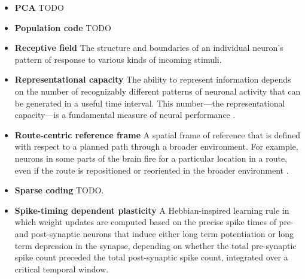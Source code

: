 \begin{itemize}
\item \textbf{\Acf{PCA}} TODO

\item \textbf{Population code} TODO

\item \textbf{Receptive field}  The structure and boundaries of an individual neuron's pattern of response to various kinds of incoming stimuli.

\item \textbf{Representational capacity} The ability to represent information depends on the number of recognizably different patterns of neuronal activity that can be generated in a useful time interval. This number---the representational capacity---is a fundamental measure of neural performance \cite{Laughlin2001}.

\item \textbf{Route-centric reference frame} A spatial frame of reference that is defined with respect to a planned path through a broader environment. For example, neurons in some parts of the brain fire for a particular location in a route, even if the route is repositioned or reoriented in the broader environment \cite{nitz2009parietal}.

\item \textbf{Sparse coding} TODO.

\item \textbf{Spike-timing dependent plasticity}  A Hebbian-inspired learning rule in which weight updates are computed based on the precise spike times of pre- and post-synaptic neurons that induce either long term potentiation or long term depression in the synapse, depending on whether the total pre-synaptic spike count preceded the total post-synaptic spike count, integrated over a critical temporal window.

\end{itemize}